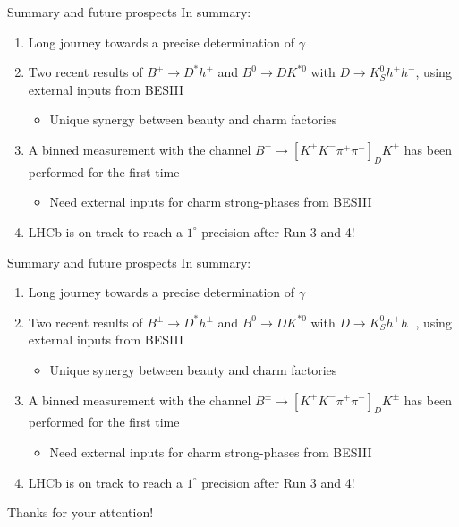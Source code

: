 \documentclass[dvipsnames]{beamer}
\begin{document}
\begin{frame}{Summary and future prospects}
  \vspace{0.0cm}
  {\Large In summary:}
  \vspace{0.3cm}
  \begin{enumerate}
    \setlength\itemsep{1.0em}
    \item{Long journey towards a precise determination of $\gamma$}
    \item{Two recent results of $B^\pm\to D^*h^\pm$ and $B^0\to DK^{*0}$ with $D\to K_S^0h^+h^-$, using external inputs from BESIII}
    \begin{itemize}
      \item{Unique synergy between beauty and charm factories}
    \end{itemize}
    \item{A binned measurement with the channel $B^\pm\to[K^+K^-\pi^+\pi^-]_DK^\pm$ has been performed for the first time}
    \begin{itemize}
      \item{Need external inputs for charm strong-phases from BESIII}
    \end{itemize}
    \item{LHCb is on track to reach a $1^\circ$ precision after Run 3 and 4!}
  \end{enumerate}
  \vspace{0.4cm}
  \begin{center}
    {\huge \phantom{Thanks for your attention!}}
  \end{center}
\end{frame}

\begin{frame}{Summary and future prospects}
  \vspace{0.0cm}
  {\Large In summary:}
  \vspace{0.3cm}
  \begin{enumerate}
    \setlength\itemsep{1.0em}
    \item{Long journey towards a precise determination of $\gamma$}
    \item{Two recent results of $B^\pm\to D^*h^\pm$ and $B^0\to DK^{*0}$ with $D\to K_S^0h^+h^-$, using external inputs from BESIII}
    \begin{itemize}
      \item{Unique synergy between beauty and charm factories}
    \end{itemize}
    \item{A binned measurement with the channel $B^\pm\to[K^+K^-\pi^+\pi^-]_DK^\pm$ has been performed for the first time}
    \begin{itemize}
      \item{Need external inputs for charm strong-phases from BESIII}
    \end{itemize}
    \item{LHCb is on track to reach a $1^\circ$ precision after Run 3 and 4!}
  \end{enumerate}
  \vspace{0.4cm}
  \begin{center}
    {\huge Thanks for your attention!}
  \end{center}
\end{frame}
\end{document}
